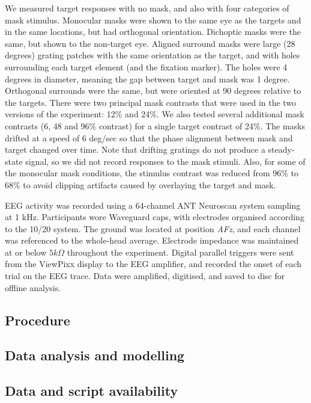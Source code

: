 \documentclass[]{article}
\begin{document}
We measured target responses with no mask, and also with four categories of mask stimulus. Monocular masks were shown to the same eye as the targets and in the same locations, but had orthogonal orientation. Dichoptic masks were the same, but shown to the non-target eye. Aligned surround masks were large (28 degrees) grating patches with the same orientation as the target, and with holes surrounding each target element (and the fixation marker). The holes were 4 degrees in diameter, meaning the gap between target and mask was 1 degree. Orthogonal surrounds were the same, but were oriented at 90 degrees relative to the targets. There were two principal mask contrasts that were used in the two versions of the experiment: 12\% and 24\%. We also tested several additional mask contrasts (6, 48 and 96\% contrast) for a single target contrast of 24\%. The masks drifted at a speed of 6 deg/sec so that the phase alignment between mask and target changed over time. Note that drifting gratings do not produce a steady-state signal, so we did not record responses to the mask stimuli. Also, for some of the monocular mask conditions, the stimulus contrast was reduced from 96\% to 68\% to avoid clipping artifacts caused by overlaying the target and mask.

EEG activity was recorded using a 64-channel ANT Neuroscan system sampling at 1 kHz. Participants wore Waveguard caps, with electrodes organised according to the 10/20 system. The ground was located at position \emph{AFz}, and each channel was referenced to the whole-head average. Electrode impedance was maintained at or below \(5k\Omega\) throughout the experiment. Digital parallel triggers were sent from the ViewPixx display to the EEG amplifier, and recorded the onset of each trial on the EEG trace. Data were amplified, digitised, and saved to disc for offline analysis.

\hypertarget{procedure}{%
\subsection{Procedure}\label{procedure}}

\hypertarget{data-analysis-and-modelling}{%
\subsection{Data analysis and modelling}\label{data-analysis-and-modelling}}

\hypertarget{data-and-script-availability}{%
\subsection{Data and script availability}\label{data-and-script-availability}}
\end{document}
